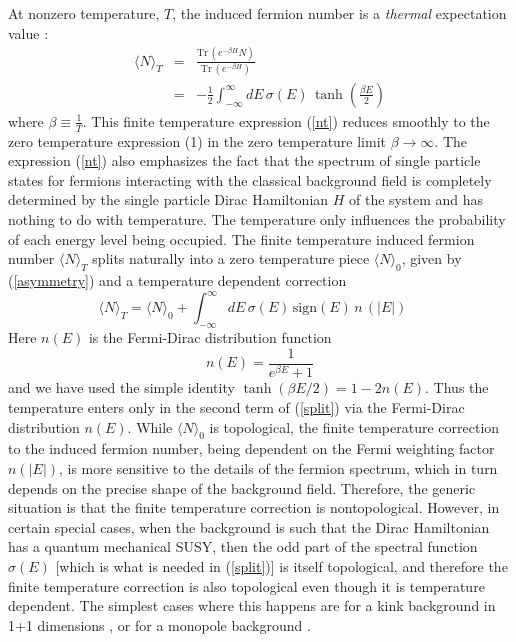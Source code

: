 \documentclass[a4paper,prd,showpacs,showkeys]{revtex4}
\begin{document}
 At nonzero temperature, $T$, the induced fermion number is a
{\it thermal} expectation value :
\begin{eqnarray}
\langle N\rangle_T &=&\frac{\textrm{Tr}\,(e^{-\beta
H}N)}{\textrm{Tr}\,(e^{-\beta H})}\nonumber\\
                   &=&-\frac{1}{2}\int_{-\infty}^{\infty}dE \,\sigma (E)
                   \,\tanh\left(\frac{\beta  E}{2}\right)
\label{nt}
\end{eqnarray}
where $\beta \equiv \frac{1}{T}$. This finite temperature
expression (\ref{nt}) reduces smoothly to the zero temperature expression
(1) in the zero temperature limit $\beta\to \infty$. The expression (\ref{nt}) also emphasizes the fact that the spectrum of single particle states for fermions interacting with the classical background field is completely determined by the single particle Dirac Hamiltonian $H$ of the system and has nothing to do with temperature. The temperature only influences the probability of each energy level being occupied. The finite temperature induced fermion number $\langle N\rangle _T$ splits naturally into a zero temperature piece $\langle N\rangle _0$, given by (\ref{asymmetry}) and a temperature dependent correction
\begin{equation}
\langle N\rangle _T=\langle N\rangle _0 +\int_{-\infty}^{\infty}dE \,\sigma (E) 
\,\textrm{sign}(E)\, n\,(|E|)\quad 
\label{split}
\end{equation}
 Here $n(E)$ is the Fermi-Dirac distribution function
\begin{equation}
n(E)=\frac{1}{e^{\beta E} +1}
\end{equation}
and we have used the simple identity  $\tanh (\beta E/2) =1 - 2 n(E)$. Thus the temperature enters only in the second term of (\ref{split}) via the Fermi-Dirac distribution $n(E)$. While $\langle N\rangle_0$ is topological, the finite temperature correction to the induced fermion number, being dependent on the Fermi weighting factor $n(|E|)$, is more sensitive to the details of the fermion spectrum, which in turn depends on the precise shape of the background field.  Therefore, the generic situation is that the finite temperature correction is 
nontopological. However, in certain special cases, when the background is such that the Dirac Hamiltonian has a quantum mechanical SUSY, then the odd part of the spectral function $\sigma (E)$ [which is what is needed in (\ref{split})] is itself topological, and therefore the finite temperature correction is also topological even though it is temperature dependent. The simplest cases where this happens are for a kink background in 1+1 dimensions \cite{semenoff,dunneian}, or for a monopole background \cite{cp,feinberg}.
\end{document}
